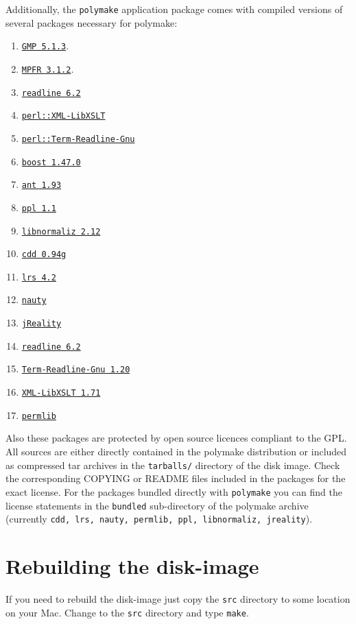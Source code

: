 \documentclass[a4paper]{amsart}
\newcommand{\polymake}{\texttt{polymake}\xspace}
\begin{document}
Additionally, the \polymake application package comes with compiled
versions of several packages necessary for polymake: 
\begin{enumerate}
\item \href{http://gmplib.org/}{\texttt{GMP 5.1.3}}.
\item \href{http://mpfr.org/}{\texttt{MPFR 3.1.2}}.
\item \href{http://tiswww.case.edu/php/chet/readline/rltop.html}{\texttt{readline 6.2}}
\item \href{http://search.cpan.org/dist/XML-LibXSLT/}{\texttt{perl::XML-LibXSLT}}
\item \href{http://search.cpan.org/dist/Term-ReadLine-Gnu/}{\texttt{perl::Term-Readline-Gnu}}
\item \href{http://www.boost.org/}{\texttt{boost 1.47.0}}
\item \href{http://ant.apache.org/}{\texttt{ant 1.93}}
\item \href{http://bugseng.com/products/ppl/}{\texttt{ppl 1.1}}
\item \href{http://www.home.uni-osnabrueck.de/wbruns/normaliz/}{\texttt{libnormaliz 2.12}}
\item \href{http://www.inf.ethz.ch/personal/fukudak/cdd_home/}{\texttt{cdd 0.94g}}
\item \href{http://cgm.cs.mcgill.ca/~avis/C/lrs.html}{\texttt{lrs 4.2}}
\item \href{http://cs.anu.edu.au/~bdm/nauty/}{\texttt{nauty}}
\item \href{http://www3.math.tu-berlin.de/jreality/}{\texttt{jReality}}
\item \href{http://cnswww.cns.cwru.edu/php/chet/readline/rltop.html}{\texttt{readline 6.2}}
\item \href{http://search.cpan.org/~hayashi/Term-ReadLine-Gnu-1.20/Gnu.pm}{\texttt{Term-Readline-Gnu 1.20}}
\item \href{http://search.cpan.org/~shlomif/XML-LibXSLT-1.87/LibXSLT.pm}{\texttt{XML-LibXSLT 1.71}}
\item \href{http://www.math.uni-rostock.de/~rehn/software/permlib.html}{\texttt{permlib}}
\end{enumerate}
Also these packages are protected by open source licences compliant to
the GPL. All sources are either directly contained in the 
polymake distribution or included as compressed tar archives in the
\texttt{tarballs/} directory of the disk image. Check the
corresponding COPYING or README files included in the packages for the
exact license.  For the packages bundled directly with \polymake you
can find the license statements in the \texttt{bundled} sub-directory
of the polymake archive (currently \texttt{cdd, lrs, nauty, permlib, ppl, libnormaliz, jreality}).

\section*{Rebuilding the disk-image}

If you need to rebuild the disk-image just copy the \texttt{src}
directory to some location on your Mac. Change to the \texttt{src}
directory and type \texttt{make}.
\end{document}

